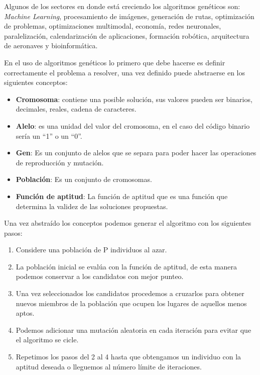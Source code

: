 \documentclass[10pt,twocolumn,a4paper]{articuloAPA}
\begin{document}
Algunos de los sectores en donde está creciendo los algoritmos genéticos son: \textit{Machine Learning}, procesamiento de imágenes, generación de rutas, optimización de problemas, optimizaciones multimodal, economía, redes neuronales, paralelización, calendarización de aplicaciones, formación robótica, arquitectura de aeronaves y bioinformática.

En el uso de algoritmos genéticos lo primero que debe hacerse es definir correctamente el problema a resolver, una vez definido puede abstraerse en los siguientes conceptos:



\begin{itemize}
  \item \textbf{Cromosoma}: contiene una posible solución, sus valores pueden ser binarios, decimales, reales, cadena de caracteres.
  \item \textbf{Alelo}: es una unidad del valor del cromosoma, en el caso del código binario sería un ``1'' o un ``0''.
  \item \textbf{Gen}: Es un conjunto de alelos que se separa para poder hacer las operaciones de reproducción y mutación.
  \item \textbf{Población}: Es un conjunto de cromosomas.
  \item \textbf{Función de aptitud}: La función de aptitud que es una función que determina la validez de las soluciones propuestas.
\end{itemize} 


Una vez abstraído los conceptos podemos generar el algoritmo con los siguientes pasos:

\begin{enumerate}
  \item Considere una población de P individuos al azar.
  \item La población inicial se evalúa con la función de aptitud, de esta manera podemos conservar a los candidatos con mejor punteo.
  \item 	Una vez seleccionados los candidatos procedemos a cruzarlos para obtener nuevos miembros de la población que ocupen los lugares de aquellos menos aptos.
  \item Podemos adicionar una mutación aleatoria en cada iteración para evitar que el algoritmo se cicle.
  \item Repetimos los pasos del 2 al 4 hasta que obtengamos un individuo con la aptitud deseada o lleguemos al número límite de iteraciones.
\end{enumerate}
\end{document}
